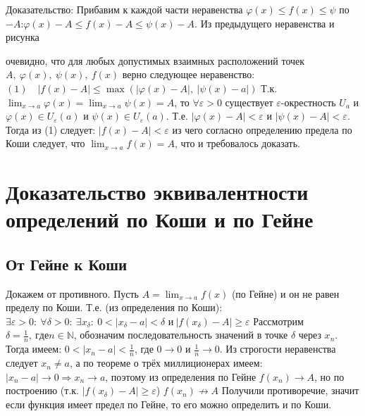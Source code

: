 Доказательство:\newline
Прибавим к каждой части неравенства $\varphi(x) \leq f(x) \leq \psi$ по $-A$:\newline $\varphi(x) - A \leq f(x) - A \leq \psi(x) - A$. Из предыдущего неравенства и рисунка\newline 
 \begin{center}
 \end{center}
  очевидно, что для любых допустимых взаимных расположений точек $A,\  \varphi(x),\  \psi(x),\  f(x)$ верно следующее неравенство:\newline
$(1)\quad |f(x) - A| \leq \max(|\varphi(x) - A|,\ |\psi(x) - a|)$\newline
Т.к. $\displaystyle \lim_{x \to a} \varphi(x) = \lim_{x \to a} \psi(x) = A$, то $\forall \varepsilon > 0$ существует $\varepsilon$-окрестность $U_a$ и\newline
$\varphi(x) \in U_{\varepsilon}(a)$ и $\psi(x) \in U_{\varepsilon}(a)$. Т.е. $|\varphi(x) - A| < \varepsilon$ и $|\psi(x) - A| < \varepsilon$.\newline
Тогда из (1) следует: $|f(x) - A| < \varepsilon$ из чего согласно определению предела по Коши следует, что $\displaystyle \lim_{x \to a} f(x) = A$, что и требовалось доказать.

\section[Док-во равенства определений]{Доказательство эквивалентности определений по Коши и по Гейне}
\subsection{От Гейне к Коши}
Докажем от противного. Пусть $\displaystyle A = \lim_{x \to a} f(x)$ (по Гейне) и он не равен пределу по Коши. Т.е. (из определения по Коши):\newline
$\exists \varepsilon > 0:\ \forall \delta > 0:\ \exists x_{\delta} : \ 0<|x_{\delta} - a| < \delta$ и$\  |f(x_{\delta}) - A| \geq \varepsilon$ \newline
Рассмотрим $\delta = \frac{1}{n},\ где n \in \mathbb{N}$, обозначим последовательность значений в точке $\delta$ через $x_n$. Тогда имеем:\newline
$0 < |x_n - a| < \frac{1}{n}$, где $0 \to 0$ и $\frac{1}{n} \to 0$.
Из строгости неравенства следует $x_n \neq a$, а по теореме о трёх миллиционерах имеем:\newline
$|x_n - a| \to 0 \Rightarrow x_n \to a$, поэтому из определения по Гейне $f(x_n) \to A$, но по построению (т.к. $|f(x_{\delta}) - A| \geq \varepsilon$) $f(x_n) \not\to A$\newline\newline
Получили противоречие, значит если функция имеет предел по Гейне, то его можно определить и по Коши.

